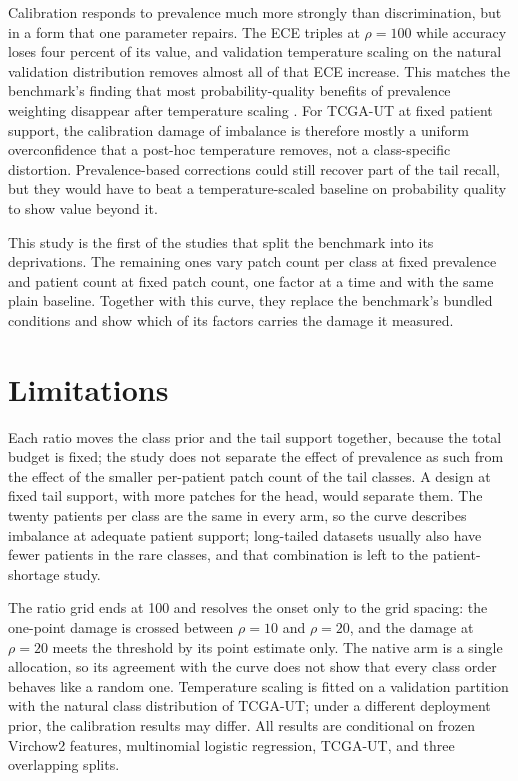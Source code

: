 Calibration responds to prevalence much more strongly than discrimination, but in a form that one parameter repairs. The ECE triples at $\rho=100$ while accuracy loses four percent of its value, and validation temperature scaling on the natural validation distribution removes almost all of that ECE increase. This matches the benchmark's finding that most probability-quality benefits of prevalence weighting disappear after temperature scaling \citep{queisler2026benchmarkResults}. For TCGA-UT at fixed patient support, the calibration damage of imbalance is therefore mostly a uniform overconfidence that a post-hoc temperature removes, not a class-specific distortion. Prevalence-based corrections \citep{buda2018systematic} could still recover part of the tail recall, but they would have to beat a temperature-scaled baseline on probability quality to show value beyond it.

This study is the first of the studies that split the benchmark into its deprivations. The remaining ones vary patch count per class at fixed prevalence and patient count at fixed patch count, one factor at a time and with the same plain baseline. Together with this curve, they replace the benchmark's bundled conditions and show which of its factors carries the damage it measured.

\section{Limitations}
\label{sec:limitations}
Each ratio moves the class prior and the tail support together, because the total budget is fixed; the study does not separate the effect of prevalence as such from the effect of the smaller per-patient patch count of the tail classes. A design at fixed tail support, with more patches for the head, would separate them. The twenty patients per class are the same in every arm, so the curve describes imbalance at adequate patient support; long-tailed datasets usually also have fewer patients in the rare classes, and that combination is left to the patient-shortage study.

The ratio grid ends at 100 and resolves the onset only to the grid spacing: the one-point damage is crossed between $\rho=10$ and $\rho=20$, and the damage at $\rho=20$ meets the threshold by its point estimate only. The native arm is a single allocation, so its agreement with the curve does not show that every class order behaves like a random one. Temperature scaling is fitted on a validation partition with the natural class distribution of TCGA-UT; under a different deployment prior, the calibration results may differ. All results are conditional on frozen Virchow2 features, multinomial logistic regression, TCGA-UT, and three overlapping splits.
